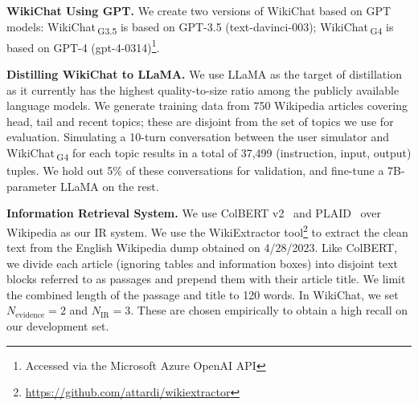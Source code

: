\documentclass[11pt]{article}
\newcommand{\system}[0]{WikiChat\xspace}
\newcommand{\systemgt}[0]{WikiChat$\,$\textsubscript{G3.5}\xspace}
\newcommand{\systemgf}[0]{WikiChat$\,$\textsubscript{G4}\xspace}
\newcommand{\colbert}[0]{ColBERT\xspace}
\begin{document}
{\bf \system Using GPT.}
We create two versions of \system based on GPT models: \systemgt is based on GPT-3.5 (text-davinci-003); \systemgf is based on GPT-4 (gpt-4-0314)\footnote{Accessed via the Microsoft Azure OpenAI API}.

{\bf Distilling \system to LLaMA.}
We use LLaMA as the target of distillation as it currently has the highest quality-to-size ratio among the publicly available language models.
We generate training data from 750 Wikipedia articles covering head, tail and recent topics; these are disjoint from the set of topics we use for evaluation. 
Simulating a 10-turn conversation between the user simulator and \systemgf for each topic results in a total of 37,499 (instruction, input, output) tuples.
We hold out 5\% of these conversations for validation, and fine-tune a 7B-parameter LLaMA on the rest. 

{\bf Information Retrieval System.}
We use \colbert v2~\cite{santhanam-etal-2022-colbertv2} and PLAID~\cite{plaid2022} over Wikipedia as our IR system. 
We use the WikiExtractor tool\footnote{\url{https://github.com/attardi/wikiextractor}} to extract the clean text from the English Wikipedia dump obtained on 4/28/2023. Like \colbert, we divide each article (ignoring tables and information boxes) into disjoint text blocks referred to as passages and prepend them with their article title. We limit the combined length of the passage and title to 120 words. In \system, we set $N_{\text{evidence}}=2$ and $N_{\text{IR}}=3$. These are chosen empirically to obtain a high recall on our development set.
\end{document}
